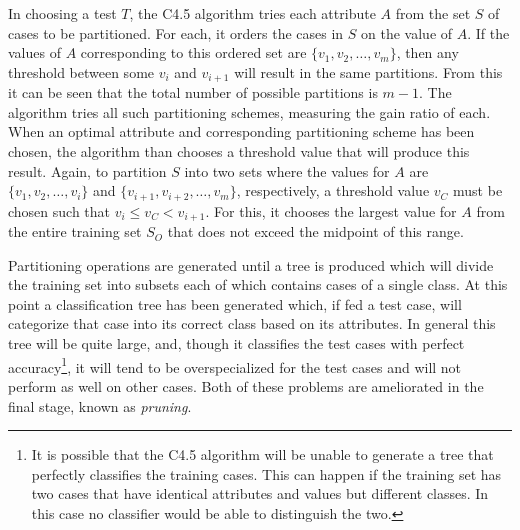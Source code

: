 \documentclass[main.tex]{subfiles}
\begin{document}
In choosing a test $T$, the C4.5 algorithm tries each attribute $A$ from the set $S$ of cases to be partitioned. For each, it orders the cases in $S$ on the value of $A$. If the values of $A$ corresponding to this ordered set are $\{v_1,v_2,\ldots,v_m\}$, then any threshold between some $v_i$ and $v_{i+1}$ will result in the same partitions. From this it can be seen that the total number of possible partitions is $m-1$. The algorithm tries all such partitioning schemes, measuring the gain ratio of each. When an optimal attribute and corresponding partitioning scheme has been chosen, the algorithm than chooses a threshold value that will produce this result. Again, to partition $S$ into two sets where the values for $A$ are $\{v_1,v_2,\ldots,v_i\}$ and $\{v_{i+1},v_{i+2},\ldots,v_m\}$, respectively, a threshold value $v_C$ must be chosen such that $v_i \leq v_C < v_{i+1}$. For this, it chooses the largest value for $A$ from the entire training set $S_O$ that does not exceed the midpoint of this range.

Partitioning operations are generated until a tree is produced which will divide the training set into subsets each of which contains cases of a single class. At this point a classification tree has been generated which, if fed a test case, will categorize that case into its correct class based on its attributes. In general this tree will be quite large, and, though it classifies the test cases with perfect accuracy\footnote{It is possible that the C4.5 algorithm will be unable to generate a tree that perfectly classifies the training cases. This can happen if the training set has two cases that have identical attributes and values but different classes. In this case no classifier would be able to distinguish the two.}, it will tend to be overspecialized for the test cases and will not perform as well on other cases. Both of these problems are ameliorated in the final stage, known as \textit{pruning}.
\end{document}
